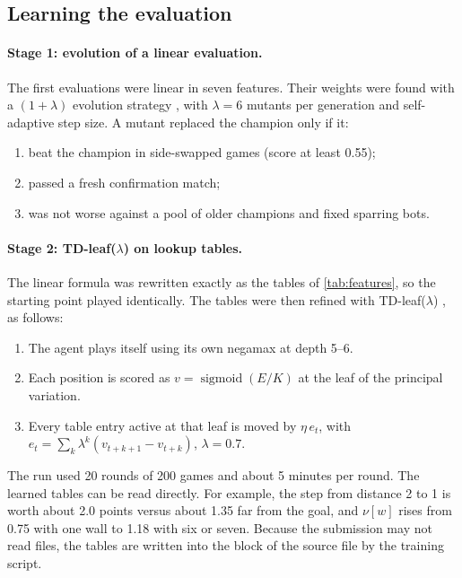 \subsection{Learning the evaluation}
\label{sec:learning}
\paragraph{Stage 1: evolution of a linear evaluation.}
The first evaluations were linear in seven features. Their weights were found with a $(1+\lambda)$
evolution strategy \citep{beyer2002es}, with $\lambda = 6$ mutants per generation and
self-adaptive step size. A mutant replaced the champion only if it:
\begin{enumerate}
  \item beat the champion in side-swapped games (score at least 0.55);
  \item passed a fresh confirmation match;
  \item was not worse against a pool of older champions and fixed sparring bots.
\end{enumerate}

\paragraph{Stage 2: TD-leaf($\lambda$) on lookup tables.}
The linear formula was rewritten exactly as the tables of \cref{tab:features}, so the starting
point played identically. The tables were then refined with TD-leaf($\lambda$)
\citep{sutton1988td,baxter2000tdleaf}, as follows:
\begin{enumerate}
  \item The agent plays itself using its own negamax at depth 5--6.
  \item Each position is scored as $v = \operatorname{sigmoid}(E/K)$ at the leaf of the
        principal variation.
  \item Every table entry active at that leaf is moved by $\eta\, e_t$, with
        $e_t = \sum_k \lambda^k (v_{t+k+1} - v_{t+k})$, $\lambda = 0.7$.
\end{enumerate}
The run used 20 rounds of 200 games and about 5 minutes per round.
The learned tables can be read directly. For example, the step from distance 2 to 1 is worth
about 2.0 points versus about 1.35 far from the goal, and $\nu[w]$ rises from 0.75 with one wall
to 1.18 with six or seven.
Because the submission may not read files, the tables are written into the
 block of the source file by the training script.

